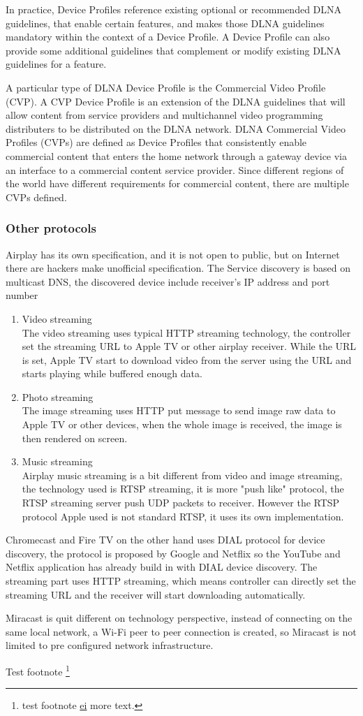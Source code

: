 \begin{enumerate}
In practice, Device Profiles reference existing optional or recommended DLNA guidelines, that enable 
certain features, and makes those DLNA guidelines mandatory within the context of a Device Profile. 
A Device Profile can also provide some additional guidelines that complement or modify existing DLNA 
guidelines for a feature.

A particular type of DLNA Device Profile is the Commercial Video Profile (CVP). A CVP Device Profile 
is an extension of the DLNA guidelines that will allow content from service providers and multichannel 
video programming distributers to be distributed on the DLNA network. DLNA Commercial Video Profiles 
(CVPs) are defined as Device Profiles that consistently enable commercial content that enters the home 
network through a gateway device via an interface to a commercial content service provider. Since 
different regions of the world have different requirements for commercial content, there are multiple 
CVPs defined.

\end{enumerate}

\subsubsection*{Other protocols}
Airplay has its own specification, and it is not open to public, but on Internet there are hackers 
make unofficial specification. The Service discovery is based on multicast DNS, the discovered 
device include receiver's IP address and port number
\begin{enumerate}
\item Video streaming \\
The video streaming uses typical HTTP streaming technology, the controller set the streaming URL 
to Apple TV or other airplay receiver. While the URL is set, Apple TV start to download video from 
the server using the URL and starts playing while buffered enough data.
\item Photo streaming \\
The image streaming uses HTTP put message to send image raw data to Apple TV or other devices, when 
the whole image is received, the image is then rendered on screen.
\item Music streaming \\
Airplay music streaming is a bit different from video and image streaming, the technology used is 
RTSP streaming, it is more "push like" protocol, the RTSP streaming server push UDP packets to 
receiver. However the RTSP protocol Apple used is not standard RTSP, it uses its own implementation.
\end{enumerate}
Chromecast and Fire TV on the other hand uses DIAL protocol for device discovery, the protocol is 
proposed by Google and Netflix so the YouTube and Netflix application has already build in with DIAL 
device discovery. The streaming part uses HTTP streaming, which means controller can directly set the 
streaming URL and the receiver will start downloading automatically.

Miracast is quit different on technology perspective, instead of connecting on the same local network, 
a Wi-Fi peer to peer connection is created, so Miracast is not limited to pre configured network 
infrastructure.


Test footnote
\footnote{test footnote \underline{ei} more text.}

